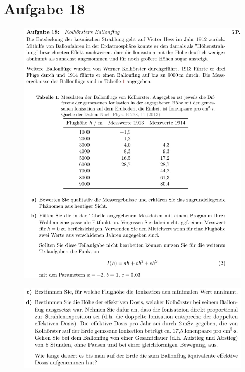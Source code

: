 \section{Aufgabe 18}

    \begin{figure}[H]
        \centering
        \includegraphics[width=\textwidth]{images/Aufgabe18a.jpg}
        \label{fig:5}
    \end{figure}

    \begin{figure}[H]
        \centering
        \includegraphics[width=\textwidth]{images/Aufgabe18b.jpg}
        \label{fig:6}
    \end{figure}

